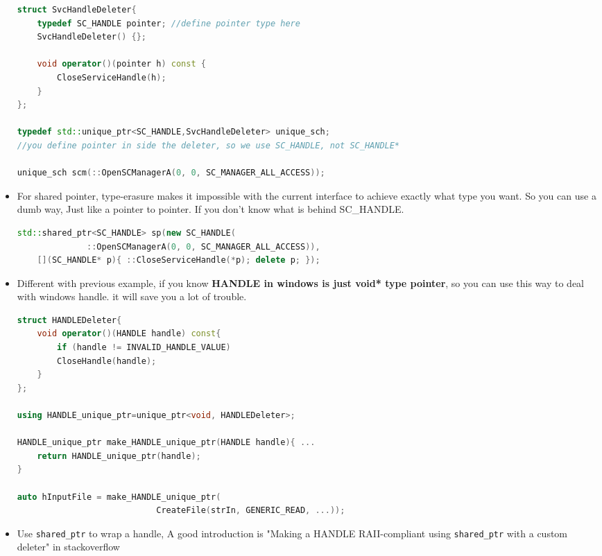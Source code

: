\documentclass[a4paper,11pt,twoside]{book}
\begin{document}
\begin{itemize}
\begin{lstlisting}[frame=single, language=c++]
struct SvcHandleDeleter{
	typedef SC_HANDLE pointer; //define pointer type here
	SvcHandleDeleter() {};
	
	void operator()(pointer h) const {
		CloseServiceHandle(h);
	}
};
	
typedef std::unique_ptr<SC_HANDLE,SvcHandleDeleter> unique_sch;
//you define pointer in side the deleter, so we use SC_HANDLE, not SC_HANDLE* 
	
unique_sch scm(::OpenSCManagerA(0, 0, SC_MANAGER_ALL_ACCESS));
\end{lstlisting}
	
	\item For shared pointer, type-erasure makes it impossible with the current interface to achieve exactly what type you want. So you can use a dumb way, Just like a pointer to pointer. If you don't know what is behind SC\_HANDLE. 
	
\begin{lstlisting}[frame=single, language=c++]
std::shared_ptr<SC_HANDLE> sp(new SC_HANDLE(
              ::OpenSCManagerA(0, 0, SC_MANAGER_ALL_ACCESS)),
	[](SC_HANDLE* p){ ::CloseServiceHandle(*p); delete p; });
\end{lstlisting}

		\item Different with previous example, if you know \textbf{HANDLE in windows is just void* type pointer}, so you can use this way to deal with windows handle. it will save you a lot of trouble. 
	
\begin{lstlisting}[frame=single, language=c++]
struct HANDLEDeleter{
	void operator()(HANDLE handle) const{
		if (handle != INVALID_HANDLE_VALUE)
		CloseHandle(handle);
	}
};
	
using HANDLE_unique_ptr=unique_ptr<void, HANDLEDeleter>;
	
HANDLE_unique_ptr make_HANDLE_unique_ptr(HANDLE handle){ ...
	return HANDLE_unique_ptr(handle);
}
	
auto hInputFile = make_HANDLE_unique_ptr(
                            CreateFile(strIn, GENERIC_READ, ...));
\end{lstlisting}
	
	\item Use \texttt{shared\_ptr} to wrap a handle, A good introduction is "Making a HANDLE RAII-compliant using \texttt{shared\_ptr} with a custom deleter" in stackoverflow


\end{itemize}
\end{document}
